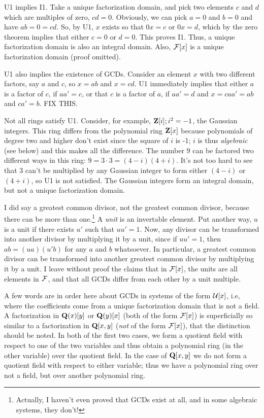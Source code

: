 U1 implies I1.  Take a unique factorization domain, and pick two
elements $c$ and $d$ which are multiples of zero, $cd=0$.  Obviously,
we can pick $a=0$ and $b=0$ and have $ab=0=cd$.  So, by U1, $x$ exists
so that $0x=c$ or $0x=d$, which by the zero theorem implies that
either $c=0$ or $d=0$.  This proves I1.  Thus, a unique factorization
domain is also an integral domain.  Also, ${\cal F}[x]$ is a unique
factorization domain (proof omitted).

U1 also implies the existence of GCDs.  Consider an element $x$ with
two different factors, say $a$ and $c$, so $x=ab$ and $x=cd$.  U1
immediately implies that either $a$ is a factor of $c$, if $aa'=c$,
or that $c$ is a factor of $a$, if $aa'=d$ and $x=caa'=ab$ and $ca'=b$.
FIX THIS.

Not all rings satisfy U1.  Consider, for example, ${\bf Z}[i];
i^2=-1$, the Gaussian integers.  This ring differs from the polynomial
ring ${\bf Z}[x]$ because polynomials of degree two and higher don't
exist since the square of $i$ is -1; $i$ is thus {\it algebraic} (see
below) and this makes all the difference.  The number 9 can be
factored two different ways in this ring: $9=3\cdot3=(4-i)(4+i)$.
It's not too hard to see that 3 can't be multiplied by any Gaussian
integer to form either $(4-i)$ or $(4+i)$, so U1 is not satisfied.
The Gaussian integers form an integral domain, but not a unique
factorization domain.

I did say a greatest common divisor, not the greatest common divisor,
because there can be more than one.\footnote{Actually, I haven't even
proved that GCDs exist at all, and in some algebraic systems, they
don't!}  A {\it unit} is an invertable element.  Put another way, $u$
is a unit if there exists $u'$ such that $uu'=1$.  Now, any divisor
can be transformed into another divisor by multiplying it by a unit,
since if $uu'=1$, then $ab=(ua)(u'b)$ for any $a$ and $b$ whatsoever.
In particular, a greatest common divisor can be transformed into
another greatest common divisor by multiplying it by a unit.  I leave
without proof the claims that in ${\cal F}[x]$, the units are all
elements in ${\cal F}$, and that all GCDs differ from each other by a
unit multiple.

A few words are in order here about GCDs in systems of the form ${\cal
U}[x]$, i.e, where the coefficients come from a unique factorization
domain that is not a field.  A factorization in ${\bf Q}(x)[y]$ or
${\bf Q}(y)[x]$ (both of the form ${\cal F}[x]$) is superficially so
similar to a factorization in ${\bf Q}[x,y]$ ({\it not} of the form
${\cal F}[x]$), that the distinction should be noted.  In both of the
first two cases, we form a quotient field with respect to one of the
two variables and thus obtain a polynomial ring (in the other
variable) over the quotient field.  In the case of ${\bf Q}[x,y]$ we
do not form a quotient field with respect to either variable; thus we
have a polynomial ring over not a field, but over another polynomial ring.

